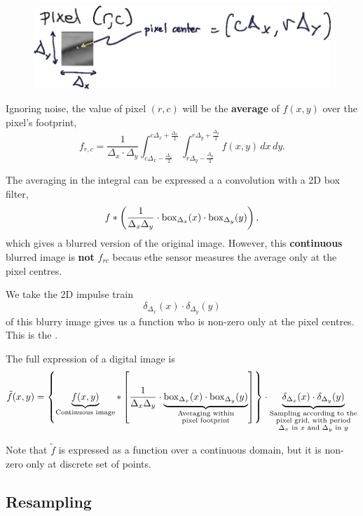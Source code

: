 \begin{figure}[ht!]
    \centering
    \includegraphics[width=0.5\linewidth]{figures/pixel-filter-definition.png}
\end{figure}

Ignoring noise, the value of pixel $(r, c)$ will be the \textbf{average} of $f(x, y)$ over the pixel's footprint, \[
    f_{r, c} = \frac{1}{\Delta_x \cdot \Delta_y} \int_{c \Delta_x - \frac{\Delta_x}{2}}^{c \Delta_x + \frac{\Delta_x}{2}} \int_{r \Delta_y - \frac{\Delta_y}{2}}^{r \Delta_y + \frac{\Delta_y}{2}} f(x, y) \, dx \, dy.
\] 

The averaging in the integral can be expressed a a convolution with a 2D box filter, \[
    f \ast \left( \frac{1}{\Delta_x \Delta_y} \cdot \mathrm{box}_{\Delta_x}(x) \cdot \mathrm{box}_{\Delta_y}(y) \right),
\] which gives a blurred version of the original image. However, this \textbf{continuous} blurred image is \textbf{not} $f_{rc}$ becaus ethe sensor measures the average only at the pixel centres.

We take the 2D impulse train \[
    \delta_{\Delta_x}(x) \cdot \delta_{\Delta_y}(y)
\] of this blurry image gives us a function who is non-zero only at the pixel centres. This is the .

The full expression of a digital image is \[
    \tilde{f}(x, y) = \left\{ \underbrace{f(x,y)}_{\text{Continuous image}} \ast \left[ \frac{1}{\Delta_x \Delta_y} \cdot \underbrace{\mathrm{box}_{\Delta_x}(x) \cdot \mathrm{box}_{\Delta_y}(y)}_{\substack{\text{Averaging within}\\\text{pixel footprint}}} \right] \right\} \cdot \underbrace{\delta_{\Delta_x}(x) \cdot \delta_{\Delta_y}(y)}_{\substack{\text{Sampling according to the}\\\text{pixel grid, with period}\\\text{$\Delta_x$ in $x$ and $\Delta_y$ in $y$}}}
\]

\begin{remark}
    Note that $\tilde{f}$ is expressed as a function over a continuous domain, but it is non-zero only at discrete set of points.
\end{remark}

\subsection{Resampling}

